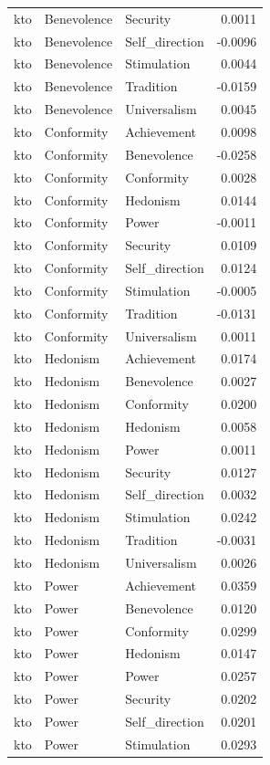 \begin{tabular}{lllr}
kto & Benevolence & Security & 0.0011 \\
kto & Benevolence & Self\_direction & -0.0096 \\
kto & Benevolence & Stimulation & 0.0044 \\
kto & Benevolence & Tradition & -0.0159 \\
kto & Benevolence & Universalism & 0.0045 \\
kto & Conformity & Achievement & 0.0098 \\
kto & Conformity & Benevolence & -0.0258 \\
kto & Conformity & Conformity & 0.0028 \\
kto & Conformity & Hedonism & 0.0144 \\
kto & Conformity & Power & -0.0011 \\
kto & Conformity & Security & 0.0109 \\
kto & Conformity & Self\_direction & 0.0124 \\
kto & Conformity & Stimulation & -0.0005 \\
kto & Conformity & Tradition & -0.0131 \\
kto & Conformity & Universalism & 0.0011 \\
kto & Hedonism & Achievement & 0.0174 \\
kto & Hedonism & Benevolence & 0.0027 \\
kto & Hedonism & Conformity & 0.0200 \\
kto & Hedonism & Hedonism & 0.0058 \\
kto & Hedonism & Power & 0.0011 \\
kto & Hedonism & Security & 0.0127 \\
kto & Hedonism & Self\_direction & 0.0032 \\
kto & Hedonism & Stimulation & 0.0242 \\
kto & Hedonism & Tradition & -0.0031 \\
kto & Hedonism & Universalism & 0.0026 \\
kto & Power & Achievement & 0.0359 \\
kto & Power & Benevolence & 0.0120 \\
kto & Power & Conformity & 0.0299 \\
kto & Power & Hedonism & 0.0147 \\
kto & Power & Power & 0.0257 \\
kto & Power & Security & 0.0202 \\
kto & Power & Self\_direction & 0.0201 \\
kto & Power & Stimulation & 0.0293 \\

\end{tabular}

